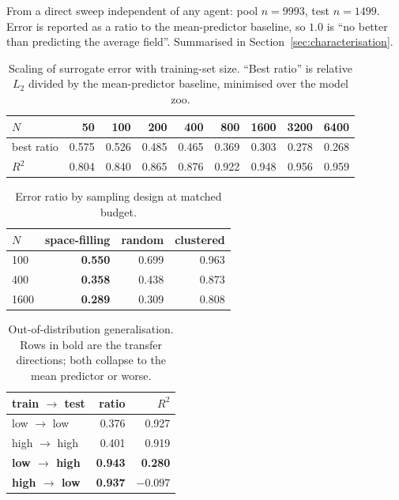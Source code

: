 From a direct sweep independent of any agent: pool $n = 9993$, test $n = 1499$.
Error is reported as a ratio to the mean-predictor baseline, so $1.0$ is ``no
better than predicting the average field''. Summarised in
Section~\ref{sec:characterisation}.

\begin{table}[htbp]
\centering
\caption{Scaling of surrogate error with training-set size. ``Best ratio'' is
relative $L_2$ divided by the mean-predictor baseline, minimised over the model
zoo.}
\label{tab:scale}
\small
\setlength{\tabcolsep}{5pt}
\begin{tabular}{@{}lrrrrrrrr@{}}
\toprule
$N$ & 50 & 100 & 200 & 400 & 800 & 1600 & 3200 & 6400 \\
\midrule
best ratio & 0.575 & 0.526 & 0.485 & 0.465 & 0.369 & 0.303 & 0.278 & 0.268 \\
$R^2$      & 0.804 & 0.840 & 0.865 & 0.876 & 0.922 & 0.948 & 0.956 & 0.959 \\
\bottomrule
\end{tabular}
\end{table}

\begin{table}[htbp]
\centering
\caption{Error ratio by sampling design at matched budget.}
\label{tab:design}
\small
\begin{tabular}{@{}lrrr@{}}
\toprule
$N$ & space-filling & random & clustered \\
\midrule
100  & \textbf{0.550} & 0.699 & 0.963 \\
400  & \textbf{0.358} & 0.438 & 0.873 \\
1600 & \textbf{0.289} & 0.309 & 0.808 \\
\bottomrule
\end{tabular}
\end{table}

\begin{table}[htbp]
\centering
\caption{Out-of-distribution generalisation. Rows in bold are the transfer
directions; both collapse to the mean predictor or worse.}
\label{tab:ood}
\small
\begin{tabular}{@{}lrr@{}}
\toprule
train $\rightarrow$ test & ratio & $R^2$ \\
\midrule
low $\rightarrow$ low   & 0.376 & 0.927 \\
high $\rightarrow$ high & 0.401 & 0.919 \\
\textbf{low $\rightarrow$ high}  & \textbf{0.943} & \textbf{0.280} \\
\textbf{high $\rightarrow$ low}  & \textbf{0.937} & \textbf{$-0.097$} \\
\bottomrule
\end{tabular}
\end{table}

